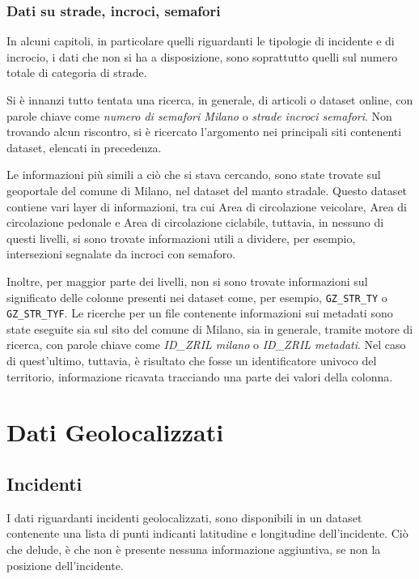 \documentclass[a4paper]{report}
\newcommand{\columnstyle}[1]{\texttt{#1}}
\newcommand{\quotestyle}[1]{\textit{#1}}
\begin{document}
\subsection{Dati su strade, incroci, semafori}

In alcuni capitoli, in particolare quelli riguardanti le tipologie di incidente e 
di incrocio, i dati che non si ha a disposizione, sono soprattutto quelli sul 
numero totale di categoria di strade.

Si è innanzi tutto tentata una ricerca, in generale, di articoli o dataset online, con 
parole chiave come \quotestyle{numero di semafori Milano} o \quotestyle{strade incroci semafori}.
Non trovando alcun riscontro, si è ricercato l'argomento nei principali siti contenenti 
dataset, elencati in precedenza. 

Le informazioni più simili a ciò che si stava cercando, sono state trovate sul geoportale 
del comune di Milano, nel dataset del manto stradale.
Questo dataset contiene vari layer di informazioni, tra cui Area di circolazione veicolare, 
Area di circolazione pedonale e Area di circolazione ciclabile, tuttavia, in nessuno 
di questi livelli, si sono trovate informazioni utili a dividere, per esempio, 
intersezioni segnalate da incroci con semaforo. 

Inoltre, per maggior parte dei livelli, non si sono trovate informazioni sul significato 
delle colonne presenti nei dataset come, per esempio, \columnstyle{GZ\_STR\_TY} o 
\columnstyle{GZ\_STR\_TYF}. 
Le ricerche per un file contenente informazioni sui metadati sono state eseguite sia 
sul sito del comune di Milano, sia in generale, tramite motore di ricerca, con parole chiave 
come \quotestyle{ID\_ZRIL milano} o \quotestyle{ID\_ZRIL metadati}. 
Nel caso di quest'ultimo, tuttavia, è risultato che fosse un identificatore univoco del 
territorio, informazione ricavata tracciando una parte dei valori della colonna.

\chapter{Dati Geolocalizzati}

\section{Incidenti}

I dati riguardanti incidenti geolocalizzati, sono disponibili in un dataset contenente una 
lista di punti indicanti latitudine e longitudine dell'incidente. 
Ciò che delude, è che non è presente nessuna informazione aggiuntiva, se non la posizione 
dell'incidente.
\end{document}
